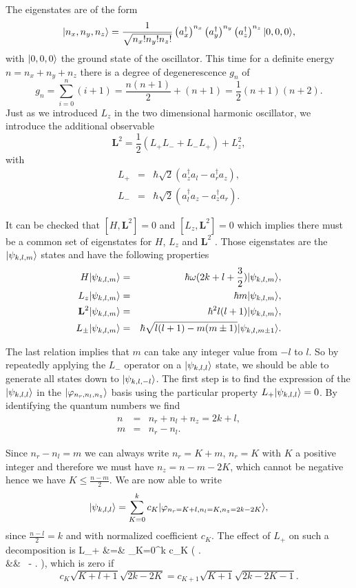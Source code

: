 The eigenstates are of the form
\[  | n_x,n_y,n_z \rangle = \frac{1}{\sqrt{n_x! n_y!n_z!}} \left( a_x^\dagger \right)^{n_x}  \left( a_y^\dagger \right)^{n_y} \left( a_z^\dagger \right)^{n_z} | 0,0,0 \rangle, \]
with $| 0,0,0 \rangle$ the ground state of the oscillator. This time for a definite energy $n=n_x+n_y+n_z$ there is a degree of degenerescence $g_n$ of
\[ g_n = \sum_{i=0}^n (i+1) = \frac{n(n+1)}{2} + (n+1) = \frac 1 2 (n+1)(n+2). \]
Just as we introduced $L_z$ in the two dimensional harmonic oscillator, we introduce the additional observable
\[ \mathbf{L}^2 = \frac 1 2 (L_+ L_- + L_- L_+) + L_z^2, \]
with
\begin{eqnarray}
    L_+ &=& \hbar \sqrt 2 (a^\dagger_z a_l - a^\dagger_r a_z), \\
    L_- &=& \hbar \sqrt 2 (a^\dagger_l a_z - a^\dagger_z a_r).
\end{eqnarray}

It can be checked that $[H,\mathbf{L}^2]=0$ and $[L_z,\mathbf{L}^2]=0$ which implies there must be a common set of eigenstates for $H$, $L_z$ and $\mathbf{L}^2$ . Those eigenstates are the $| \psi_{k,l,m} \rangle$ states and have the following properties
\begin{eqnarray}
    H | \psi_{k,l,m} \rangle &=& \hbar \omega(2k+l+\frac 3 2) | \psi_{k,l,m} \rangle,\\
    L_z | \psi_{k,l,m} \rangle &=& \hbar m | \psi_{k,l,m} \rangle,\\
    \mathbf{L}^2 | \psi_{k,l,m} \rangle &=& \hbar^2 l(l+1) | \psi_{k,l,m} \rangle, \\
    L_\pm | \psi_{k,l,m} \rangle &=& \hbar \sqrt{l(l+1)-m(m\pm1)} | \psi_{k,l,m\pm1} \rangle.\\
\end{eqnarray}

The last relation implies that $m$ can take any integer value from $-l$ to $l$. So by repeatedly applying the $L_-$ operator on a $| \psi_{k,l,l} \rangle$ state, we should be able to generate all states down to $| \psi_{k,l,-l} \rangle$. The first step is to find the expression of the $| \psi_{k,l,l} \rangle$ in the $| \varphi_{n_r,n_l,n_z} \rangle$ basis using the particular property $L_+ | \psi_{k,l,l} \rangle = 0$. By identifying the quantum numbers we find
\begin{eqnarray}
    n&=& n_r + n_l + n_z = 2k+ l, \\
    m &=& n_r - n_l.
\end{eqnarray}

Since $n_r-n_l=m$ we can always write $n_r = K+m$, $n_r=K$ with $K$ a positive integer and therefore we must have $n_z=n-m-2K$, which cannot be negative hence we have $K \le \frac{n-m}{2}$.  We are now able to write
\[ | \psi_{k,l,l} \rangle = \sum_{K=0}^k c_K | \varphi_{n_r=K+l, n_l=K, n_z = 2k-2K} \rangle, \]
since $\frac{n-l}{2} = k$ and with normalized coefficient $c_K$. The effect of $L_+$ on such a decomposition is
\bea
L_+  &=& \sum_{K=0}^k c_K  \hbar \left(    \right. \nonumber \\
&& \ - \left.   \right),
\eea
which is zero if
\[ c_K  \sqrt{K+l+1}\sqrt{2k-2K} = c_{K+1} \sqrt{K+1} \sqrt{2k-2K-1}. \]


